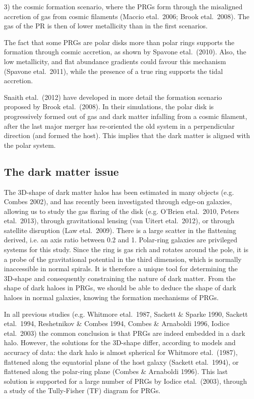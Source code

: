 \documentclass[traditabstract]{aa}
\def\ts     {\thinspace}
\def\etal   {{\rm et\ts al.}~}
\begin{document}
3)  the cosmic formation scenario, where the PRGs form through the misaligned accretion
of gas from cosmic filaments (Maccio \etal 2006; 
Brook \etal 2008). The gas of the PR is then of lower metallicity 
than in the first scenarios.

 The fact that some PRGs are polar disks more than polar rings
supports the formation through cosmic accretion, as shown by Spavone \etal (2010).
Also, the low metallicity, and flat abundance gradients could favour
this mechanism (Spavone \etal 2011), while the presence of a true ring supports
the tidal accretion.

Snaith \etal (2012) have developed in more detail the formation scenario proposed by 
Brook \etal (2008). In their simulations, the polar disk is progressively
formed out of gas and dark matter infalling from a cosmic filament, after 
the last major merger has re-oriented the old system in a perpendicular
direction (and formed the host). This implies that the dark matter is aligned
with the polar system.


\subsection{The dark matter issue}

 The 3D-shape of dark matter halos has been estimated in 
many objects (e.g. Combes 2002), and has recently been investigated
through edge-on galaxies, allowing us to study the gas flaring of the disk
(e.g. O'Brien \etal 2010, Peters \etal 2013), through gravitational lensing
(van Uitert \etal 2012), or through satellite disruption (Law \etal 2009).
There is a large scatter in the flattening derived, i.e.
an axis ratio between 0.2 and 1.
Polar-ring galaxies are privileged systems for this study.
Since the ring is gas rich and rotates around the pole, it is
a probe of the gravitational potential in the third
dimension, which is normally inaccessible in normal spirals.
It is therefore a unique tool for determining the 3D-shape
and consequently constraining the nature of dark matter.
From the shape of dark haloes in PRGs, we should be able to deduce
the shape of dark haloes in normal galaxies,  knowing
the formation mechanisms of PRGs.

In all previous studies (e.g. Whitmore \etal 1987, Sackett \& Sparke 1990,
Sackett \etal 1994, Reshetnikov \& Combes 1994, Combes \& Arnaboldi 1996,
Iodice \etal 2003) the common conclusion is that PRGs are
indeed embedded in a dark halo.
However, the solutions for the 3D-shape
differ, according to models and accuracy of data:
the dark halo is almost spherical for Whitmore \etal (1987), flattened
along the equatorial plane of the host galaxy (Sackett \etal 1994),
or flattened along the polar-ring plane (Combes \& Arnaboldi 1996).
 This last solution is supported for a large number of PRGs
by Iodice \etal (2003), through a study of the Tully-Fisher (TF) diagram
for PRGs.
\end{document}
